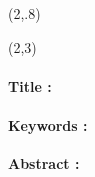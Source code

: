 
\begin{textblock}{10}(2,.8)
\logoED
\end{textblock}


\begin{textblock}{13}(2,3)
\paragraph{Title : \PhDTitleEN} 
\paragraph{Keywords : }\PhDkeywordsEN  \bigskip

\textbf{Abstract :} \PhDsumEN
\end{textblock}


